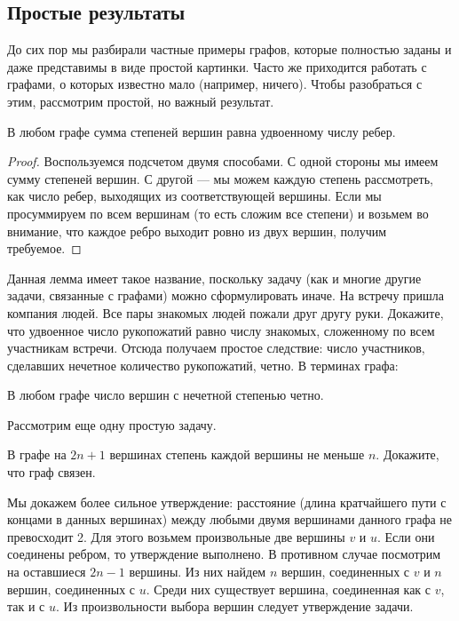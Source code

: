 \subsection{Простые результаты}

До сих пор мы разбирали частные примеры графов, которые
полностью заданы и даже представимы в виде простой картинки.
Часто же приходится работать с графами, о которых известно
мало (например, ничего). Чтобы разобраться с этим, рассмотрим
простой, но важный результат.

\begin{lemma}[О рукопожатиях]
    В любом графе сумма степеней вершин равна удвоенному числу
    ребер.
\end{lemma}
\begin{proof}
    Воспользуемся подсчетом двумя способами. С одной стороны
    мы имеем сумму степеней вершин. С другой --- мы можем
    каждую степень рассмотреть, как число ребер, выходящих
    из соответствующей вершины. Если мы просуммируем по всем
    вершинам (то есть сложим все степени) и возьмем во
    внимание, что каждое ребро выходит ровно из двух вершин,
    получим требуемое.
\end{proof}

Данная лемма имеет такое название, поскольку задачу (как и
многие другие задачи, связанные с графами) можно сформулировать
иначе. На встречу пришла компания людей. Все пары знакомых людей
пожали друг другу руки. Докажите, что удвоенное число рукопожатий
равно числу знакомых, сложенному по всем участникам встречи.
Отсюда получаем простое следствие: число участников, сделавших
нечетное количество рукопожатий, четно. В терминах графа:

\begin{corollary}
    В любом графе число вершин с нечетной степенью четно.
\end{corollary}

Рассмотрим еще одну простую задачу.

\begin{task}
    В графе на $2n+1$ вершинах степень каждой вершины не меньше $n$.
    Докажите, что граф связен.
\end{task}

Мы докажем более сильное утверждение: расстояние (длина кратчайшего пути
с концами в данных вершинах) между любыми двумя
вершинами данного графа не превосходит 2. Для этого возьмем произвольные
две вершины $v$ и $u$. Если они соединены ребром, то утверждение
выполнено. В противном случае посмотрим на оставшиеся $2n-1$ вершины. Из
них найдем $n$ вершин, соединенных с $v$ и $n$ вершин, соединенных с $u$.
Среди них существует вершина, соединенная как с $v$, так и с $u$. Из
произвольности выбора вершин следует утверждение задачи.

